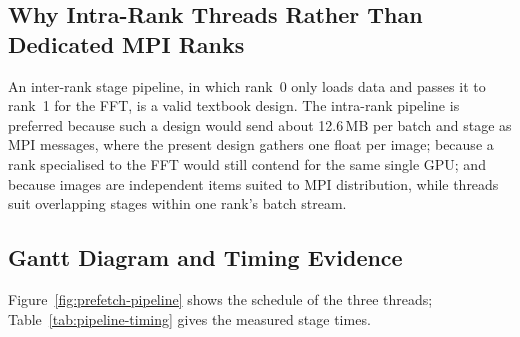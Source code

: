 \documentclass[a4paper,12pt]{report}
\begin{document}
\subsection{Why Intra-Rank Threads Rather Than Dedicated MPI Ranks}

An inter-rank stage pipeline, in which rank~0 only loads data and passes it to
rank~1 for the FFT, is a valid textbook design. The intra-rank pipeline is preferred
because such a design would send about 12.6\,MB per batch and stage as MPI messages,
where the present design gathers one float per image; because a rank specialised
to the FFT would still contend for the same single GPU; and because images are
independent items suited to MPI distribution, while threads suit overlapping stages
within one rank's batch stream.

\subsection{Gantt Diagram and Timing Evidence}

Figure~\ref{fig:prefetch-pipeline} shows the schedule of the three threads;
Table~\ref{tab:pipeline-timing} gives the measured stage times.
\end{document}
